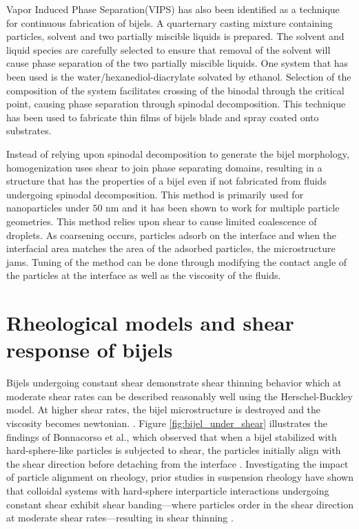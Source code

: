 Vapor Induced Phase Separation(VIPS) has also been identified as a technique for continuous fabrication of bijels. \cite{wang_scalable_2020} A quarternary casting mixture
containing particles, solvent and two partially miscible liquids is prepared. The solvent and liquid species are carefully selected to ensure that removal of the
solvent will cause phase separation of the two partially miscible liquids. One system that has been used is the water/hexanediol-diacrylate solvated by ethanol.
Selection of the composition of the system facilitates crossing of the binodal through the critical point, causing phase separation through spinodal decomposition.
This technique has been used to fabricate thin films of bijels blade and spray coated onto substrates.

Instead of relying upon spinodal decomposition to generate the bijel morphology, homogenization uses shear to join phase separating domains, resulting in a 
structure that has the properties of a bijel even if not fabricated from fluids undergoing spinodal decomposition. \cite{huang_bicontinuous_2017, cai_bijels_2017} 
This method is primarily used for nanoparticles under $50$ nm and it has been shown to work for multiple particle geometries. This method relies upon
shear to cause limited coalescence of droplets. As coarsening occurs, particles adsorb on the interface and when the interfacial area matches the area of the
adsorbed particles, the microstructure jams. Tuning of the method can be done through modifying the contact angle of the particles at the interface as well as
the viscosity of the fluids. 



\section{Rheological models and shear response of bijels}

Bijels undergoing constant shear demonstrate shear thinning behavior which at moderate shear rates can be described reasonably well using the Herschel-Buckley
model. \cite{macmillan_rheological_2019, wang_morphology_2023} At higher shear rates, the bijel microstructure is destroyed and the viscosity becomes newtonian. 
\cite{cai_bijels_2017,bonaccorso_shear_2020}. Figure \ref{fig:bijel_under_shear} illustrates the findings of Bonnacorso et al., which observed that when a bijel 
stabilized with hard-sphere-like particles is subjected to shear, the particles initially align with the shear direction before detaching from the interface 
\cite{bonaccorso_shear_2020}. Investigating the impact of particle alignment on rheology, prior studies in suspension rheology have shown that colloidal systems 
with hard-sphere interparticle interactions undergoing constant shear exhibit shear banding—where particles order in the shear direction at moderate shear rates—resulting 
in shear thinning \cite{vermant_flow-induced_2005, brader_nonlinear_2010}. 

